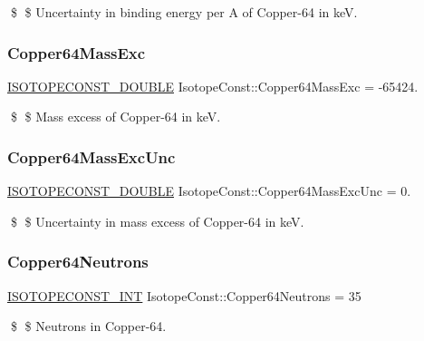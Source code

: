 \$ \$ Uncertainty in binding energy per A of Copper-\/64 in keV. \mbox{\label{group___isotope_const-_copper-_cu64_ga9ee041a338946489acb8f69bd355cbc9}} 
\subsubsection{\texorpdfstring{Copper64\+Mass\+Exc}{Copper64MassExc}}
{\footnotesize\ttfamily \mbox{\hyperlink{group___isotope_const-_macros_ga8f45a7272ce02c0b4c65c44636ed719a}{I\+S\+O\+T\+O\+P\+E\+C\+O\+N\+S\+T\+\_\+\+D\+O\+U\+B\+LE}} Isotope\+Const\+::\+Copper64\+Mass\+Exc = -\/65424.}

\$ \$ Mass excess of Copper-\/64 in keV. \mbox{\label{group___isotope_const-_copper-_cu64_ga60e970cec0b296bf4f44197c49bff6b7}} 
\subsubsection{\texorpdfstring{Copper64\+Mass\+Exc\+Unc}{Copper64MassExcUnc}}
{\footnotesize\ttfamily \mbox{\hyperlink{group___isotope_const-_macros_ga8f45a7272ce02c0b4c65c44636ed719a}{I\+S\+O\+T\+O\+P\+E\+C\+O\+N\+S\+T\+\_\+\+D\+O\+U\+B\+LE}} Isotope\+Const\+::\+Copper64\+Mass\+Exc\+Unc = 0.}

\$ \$ Uncertainty in mass excess of Copper-\/64 in keV. \mbox{\label{group___isotope_const-_copper-_cu64_gaff84b63abe19e24a82d03a8787cec6cd}} 
\subsubsection{\texorpdfstring{Copper64\+Neutrons}{Copper64Neutrons}}
{\footnotesize\ttfamily \mbox{\hyperlink{group___isotope_const-_macros_ga5f18360b3e99483a35c32d789e62621c}{I\+S\+O\+T\+O\+P\+E\+C\+O\+N\+S\+T\+\_\+\+I\+NT}} Isotope\+Const\+::\+Copper64\+Neutrons = 35}

\$ \$ Neutrons in Copper-\/64. \mbox{\label{group___isotope_const-_copper-_cu64_ga5b40061409466169d763f1311e7351ea}} 
